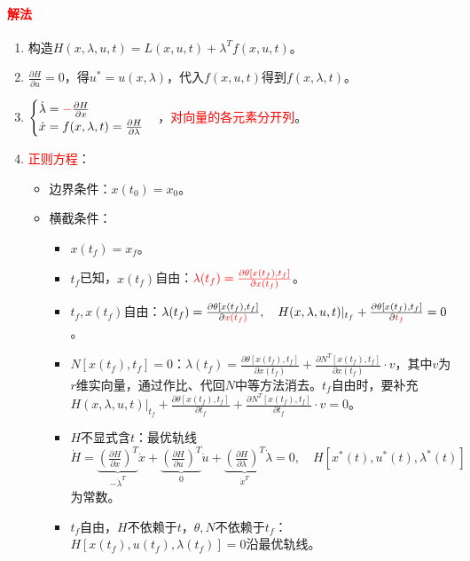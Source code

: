 \documentclass[
12pt, %
a4paper, 
oneside, %
]{scrartcl}
\begin{document}
\paragraph{\textcolor{red}{解法}}
\begin{enumerate}
\item 构造$ H(x, \lambda, u, t) = L(x, u, t) + \lambda^T f(x, u, t) $。
\item $ \frac{\partial H}{\partial u} = 0 $，得$ u^* = u(x, \lambda) $，代入$ f(x, u, t) $得到$ f(x, \lambda, t) $。
\item $ \begin{cases} \dot{\lambda} = \textcolor{red}{-}\frac{\partial H}{\partial x} \\ \dot{x} = f(x, \lambda, t) = \frac{\partial H}{\partial \lambda} \end{cases} $，\textcolor{red}{对向量的各元素分开列}。
\item \textcolor{red}{正则方程}：
\begin{itemize}
\item 边界条件：$ x(t_0) = x_0 $。
\item 横截条件：
\begin{itemize}
\item $ x(t_f) = x_f $。
\item $ t_f $已知，$ x(t_f) $自由：$ \textcolor{red}{\lambda(t_f) = \frac{\partial \theta[x(t_f), t_f]}{\partial x(t_f)}} $。
\item $ t_f, x(t_f) $自由：$ \lambda(t_f) = \frac{\partial \theta[x(t_f), t_f]}{\partial \textcolor{red}{x(t_f)}}, \quad H(x, \lambda, u, t)|_{t_f} + \frac{\partial \theta[x(t_f), t_f]}{\partial \textcolor{red}{t_f}} = 0 $。
\item $ N[x(t_f), t_f] = 0 $：$ \lambda(t_f) = \frac{\partial \theta[x(t_f), t_f]}{\partial x(t_f)} + \frac{\partial N^T[x(t_f), t_f]}{\partial x(t_f)} \cdot v $，其中$ v $为$ r $维实向量，通过作比、代回$ N $中等方法消去。$ t_f $自由时，要补充$ H(x, \lambda, u, t)|_{t_f} + \frac{\partial \theta[x(t_f), t_f]}{\partial t_f} + \frac{\partial N^T[x(t_f), t_f]}{\partial t_f} \cdot v = 0 $。
\item $ H $不显式含$ t $：最优轨线$ \dot{H} = \underbrace{(\frac{\partial H}{\partial x})^T}_{-\dot{\lambda}^T} \dot{x} + \underbrace{(\frac{\partial H}{\partial u})^T}_{0} \dot{u} + \underbrace{(\frac{\partial H}{\partial \lambda})^T}_{\dot{x}^T} \dot{\lambda} = 0, \quad H[x^*(t), u^*(t), \lambda^*(t)] $为常数。
\item $ t_f $自由，$ H $不依赖于$ t $，$ \theta, N $不依赖于$ t_f $：$ H[x(t_f), u(t_f), \lambda(t_f)] = 0 $沿最优轨线。
\end{itemize}
\end{itemize}
\end{enumerate}
\end{document}
